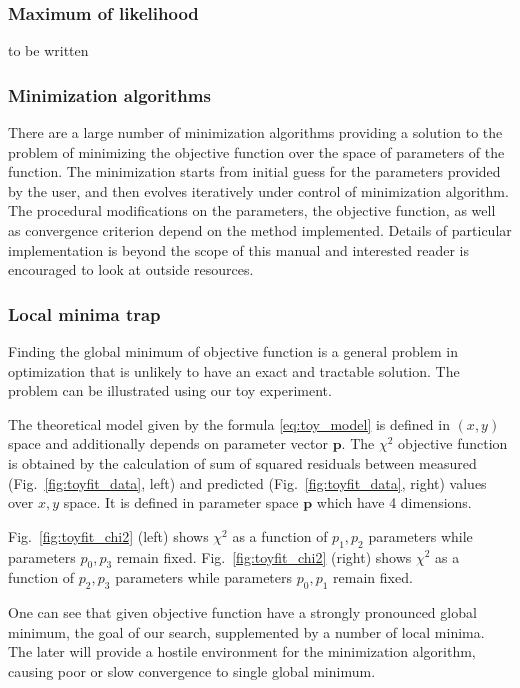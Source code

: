 \subsubsection*{Maximum of likelihood}
to be written


\subsubsection*{Minimization algorithms}
There are a large number of minimization algorithms providing a solution to the problem
of minimizing the objective function over the space of parameters of the function.
The minimization starts from initial guess for the parameters provided by the user,
and then evolves iteratively under control of minimization algorithm. The procedural
modifications on the parameters, the objective function, as well as convergence
criterion depend on the method implemented.
Details of particular implementation is beyond the scope of this manual and
 interested reader is encouraged to look at outside resources.



\subsubsection*{Local minima trap}
Finding the global minimum of objective function 
is a general problem in optimization that is unlikely to have an exact and 
tractable solution. The problem can be illustrated using our toy experiment.

The theoretical model given by the formula \ref{eq:toy_model} is defined
in $(x,y)$ space and additionally depends on parameter vector $\mathbf{p}$. 
The $\chi^2$ 
objective function is obtained by the calculation of sum of squared residuals between
measured (Fig.~\ref{fig:toyfit_data}, left) and 
predicted (Fig.~\ref{fig:toyfit_data}, right) values over $x,y$ space. It is defined
in parameter space $\mathbf{p}$ which have 4 dimensions.

Fig.~\ref{fig:toyfit_chi2} (left) shows $\chi^2$ as a function of
$p_1,p_2$ parameters while parameters $p_0,p_3$ remain fixed.
Fig.~\ref{fig:toyfit_chi2} (right) shows $\chi^2$ as a function of
$p_2,p_3$ parameters while parameters $p_0,p_1$ remain fixed.

One can see that given objective function have a strongly pronounced global minimum,
the goal of our search, supplemented by a number of local minima.
The later will provide a hostile environment for the minimization algorithm, causing
poor or slow convergence to single global minimum.


